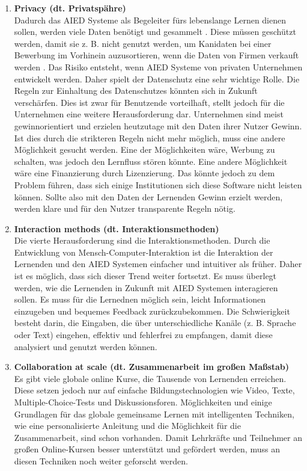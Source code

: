 \begin{enumerate}
      \item \textbf{Privacy (dt. Privatspähre)} \\
            Dadurch das AIED Systeme als Begeleiter fürs lebenslange Lernen dienen sollen, werden viele Daten benötigt und gesammelt \cite[S. 10]{Pinkwart.2016}.
            Diese müssen geschützt werden, damit sie z. B. nicht genutzt werden, um Kanidaten bei einer Bewerbung im Vorhinein auzusortieren, wenn die Daten von Firmen verkauft werden \cite[S. 9f]{Pinkwart.2016}.
            Das Risiko entsteht, wenn AIED Systeme von privaten Unternehmen entwickelt werden. Daher spielt der Datenschutz eine sehr wichtige Rolle. Die Regeln zur Einhaltung des Datenschutzes könnten sich in Zukunft verschärfen.
            Dies ist zwar für Benutzende vorteilhaft, stellt jedoch für die Unternehmen eine weitere Herausforderung dar. Unternehmen sind meist gewinnorientiert und erzielen heutzutage mit den Daten ihrer Nutzer Gewinn.
            Ist dies durch die strikteren Regeln nicht mehr möglich, muss eine andere Möglichkeit gesucht werden. Eine der Möglichkeiten wäre, Werbung zu schalten, was jedoch den Lernfluss stören könnte.
            Eine andere Möglichkeit wäre eine Finanzierung durch Lizenzierung. Das könnte jedoch zu dem Problem führen, dass sich einige Institutionen sich diese Software nicht leisten können.
            Sollte also mit den Daten der Lernenden Gewinn erzielt werden, werden klare und für den Nutzer transparente Regeln nötig. \cite[S. 10f]{Pinkwart.2016}

      \item \textbf{Interaction methods (dt. Interaktionsmethoden)} \\
            Die vierte Herausforderung sind die Interaktionsmethoden. Durch die Entwicklung von Mensch-Computer-Interaktion ist die Interaktion der Lernenden und den AIED Systemen einfacher und intuitiver als früher.
            Daher ist es möglich, dass sich dieser Trend weiter fortsetzt. Es muss überlegt werden, wie die Lernenden in Zukunft mit AIED Systemen interagieren sollen.
            Es muss für die Lernednen möglich sein, leicht Informationen einzugeben und bequemes Feedback zurückzubekommen.
            Die Schwierigkeit besteht darin, die Eingaben, die über unterschiedliche Kanäle (z. B. Sprache oder Text) eingehen, effektiv und fehlerfrei zu empfangen, damit diese analysiert und genutzt werden können. \cite[S. 11]{Pinkwart.2016}

      \item \textbf{Collaboration at scale (dt. Zusammenarbeit im großen Maßstab)} \\
            Es gibt viele globale online Kurse, die Tausende von Lernenden erreichen. Diese setzen jedoch nur auf einfache Bildungstechnologien wie Video, Texte, Multiple-Choice-Tests und Diskussionsforen.
            Möglichkeiten und einige Grundlagen für das globale gemeinsame Lernen mit intelligenten Techniken, wie eine personalisierte Anleitung und die Möglichkeit für die Zusammenarbeit, sind schon vorhanden.
            Damit Lehrkräfte und Teilnehmer an großen Online-Kursen besser unterstützt und gefördert werden, muss an diesen Techniken noch weiter geforscht werden. \cite[S. 11]{Pinkwart.2016}


\end{enumerate}
